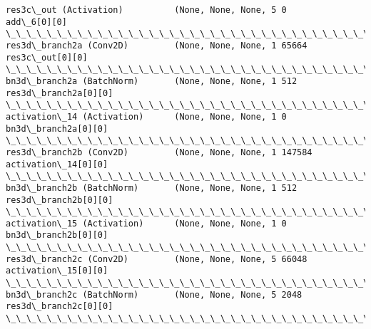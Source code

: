 \documentclass[11pt]{article}
\begin{document}
\begin{Verbatim}[commandchars=\\\{\}]
res3c\_out (Activation)          (None, None, None, 5 0           add\_6[0][0]                      
\_\_\_\_\_\_\_\_\_\_\_\_\_\_\_\_\_\_\_\_\_\_\_\_\_\_\_\_\_\_\_\_\_\_\_\_\_\_\_\_\_\_\_\_\_\_\_\_\_\_\_\_\_\_\_\_\_\_\_\_\_\_\_\_\_\_\_\_\_\_\_\_\_\_\_\_\_\_\_\_\_\_\_\_\_\_\_\_\_\_\_\_\_\_\_\_\_\_
res3d\_branch2a (Conv2D)         (None, None, None, 1 65664       res3c\_out[0][0]                  
\_\_\_\_\_\_\_\_\_\_\_\_\_\_\_\_\_\_\_\_\_\_\_\_\_\_\_\_\_\_\_\_\_\_\_\_\_\_\_\_\_\_\_\_\_\_\_\_\_\_\_\_\_\_\_\_\_\_\_\_\_\_\_\_\_\_\_\_\_\_\_\_\_\_\_\_\_\_\_\_\_\_\_\_\_\_\_\_\_\_\_\_\_\_\_\_\_\_
bn3d\_branch2a (BatchNorm)       (None, None, None, 1 512         res3d\_branch2a[0][0]             
\_\_\_\_\_\_\_\_\_\_\_\_\_\_\_\_\_\_\_\_\_\_\_\_\_\_\_\_\_\_\_\_\_\_\_\_\_\_\_\_\_\_\_\_\_\_\_\_\_\_\_\_\_\_\_\_\_\_\_\_\_\_\_\_\_\_\_\_\_\_\_\_\_\_\_\_\_\_\_\_\_\_\_\_\_\_\_\_\_\_\_\_\_\_\_\_\_\_
activation\_14 (Activation)      (None, None, None, 1 0           bn3d\_branch2a[0][0]              
\_\_\_\_\_\_\_\_\_\_\_\_\_\_\_\_\_\_\_\_\_\_\_\_\_\_\_\_\_\_\_\_\_\_\_\_\_\_\_\_\_\_\_\_\_\_\_\_\_\_\_\_\_\_\_\_\_\_\_\_\_\_\_\_\_\_\_\_\_\_\_\_\_\_\_\_\_\_\_\_\_\_\_\_\_\_\_\_\_\_\_\_\_\_\_\_\_\_
res3d\_branch2b (Conv2D)         (None, None, None, 1 147584      activation\_14[0][0]              
\_\_\_\_\_\_\_\_\_\_\_\_\_\_\_\_\_\_\_\_\_\_\_\_\_\_\_\_\_\_\_\_\_\_\_\_\_\_\_\_\_\_\_\_\_\_\_\_\_\_\_\_\_\_\_\_\_\_\_\_\_\_\_\_\_\_\_\_\_\_\_\_\_\_\_\_\_\_\_\_\_\_\_\_\_\_\_\_\_\_\_\_\_\_\_\_\_\_
bn3d\_branch2b (BatchNorm)       (None, None, None, 1 512         res3d\_branch2b[0][0]             
\_\_\_\_\_\_\_\_\_\_\_\_\_\_\_\_\_\_\_\_\_\_\_\_\_\_\_\_\_\_\_\_\_\_\_\_\_\_\_\_\_\_\_\_\_\_\_\_\_\_\_\_\_\_\_\_\_\_\_\_\_\_\_\_\_\_\_\_\_\_\_\_\_\_\_\_\_\_\_\_\_\_\_\_\_\_\_\_\_\_\_\_\_\_\_\_\_\_
activation\_15 (Activation)      (None, None, None, 1 0           bn3d\_branch2b[0][0]              
\_\_\_\_\_\_\_\_\_\_\_\_\_\_\_\_\_\_\_\_\_\_\_\_\_\_\_\_\_\_\_\_\_\_\_\_\_\_\_\_\_\_\_\_\_\_\_\_\_\_\_\_\_\_\_\_\_\_\_\_\_\_\_\_\_\_\_\_\_\_\_\_\_\_\_\_\_\_\_\_\_\_\_\_\_\_\_\_\_\_\_\_\_\_\_\_\_\_
res3d\_branch2c (Conv2D)         (None, None, None, 5 66048       activation\_15[0][0]              
\_\_\_\_\_\_\_\_\_\_\_\_\_\_\_\_\_\_\_\_\_\_\_\_\_\_\_\_\_\_\_\_\_\_\_\_\_\_\_\_\_\_\_\_\_\_\_\_\_\_\_\_\_\_\_\_\_\_\_\_\_\_\_\_\_\_\_\_\_\_\_\_\_\_\_\_\_\_\_\_\_\_\_\_\_\_\_\_\_\_\_\_\_\_\_\_\_\_
bn3d\_branch2c (BatchNorm)       (None, None, None, 5 2048        res3d\_branch2c[0][0]             
\_\_\_\_\_\_\_\_\_\_\_\_\_\_\_\_\_\_\_\_\_\_\_\_\_\_\_\_\_\_\_\_\_\_\_\_\_\_\_\_\_\_\_\_\_\_\_\_\_\_\_\_\_\_\_\_\_\_\_\_\_\_\_\_\_\_\_\_\_\_\_\_\_\_\_\_\_\_\_\_\_\_\_\_\_\_\_\_\_\_\_\_\_\_\_\_\_\_

\end{Verbatim}
\end{document}
